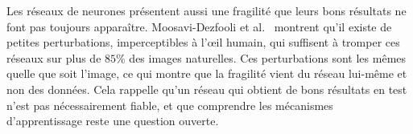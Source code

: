 \documentclass[a4paper,french]{style-LaTeX}
\begin{document}
Les réseaux de neurones présentent aussi une fragilité que leurs bons résultats ne font pas toujours apparaître. Moosavi-Dezfooli et al.\ \cite{MoosaviDezfooli17} montrent qu'il existe de petites perturbations, imperceptibles à l'œil humain, qui suffisent à tromper ces réseaux sur plus de $85\%$ des images naturelles. Ces perturbations sont les mêmes quelle que soit l'image, ce qui montre que la fragilité vient du réseau lui-même et non des données. Cela rappelle qu'un réseau qui obtient de bons résultats en test n'est pas nécessairement fiable, et que comprendre les mécanismes d'apprentissage reste une question ouverte.


{\small


}
\end{document}
